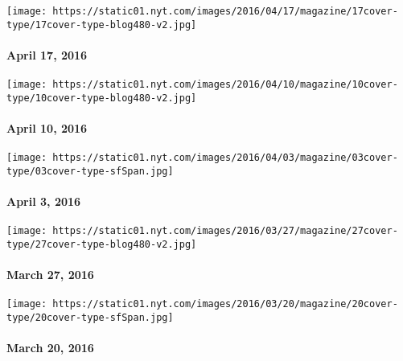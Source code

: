 \href{http://www.nytimes.com/indexes/2016/04/17/magazine/index.html}{}

\texttt{[image: https://static01.nyt.com/images/2016/04/17/magazine/17cover-type/17cover-type-blog480-v2.jpg]}

\hypertarget{april-17-2016}{%
\paragraph{April 17, 2016}\label{april-17-2016}}

\href{http://www.nytimes.com/indexes/2016/04/11/magazine/index.html}{}

\texttt{[image: https://static01.nyt.com/images/2016/04/10/magazine/10cover-type/10cover-type-blog480-v2.jpg]}

\hypertarget{april-10-2016}{%
\paragraph{April 10, 2016}\label{april-10-2016}}

\href{http://www.nytimes.com/indexes/2016/04/03/magazine/index.html}{}

\texttt{[image: https://static01.nyt.com/images/2016/04/03/magazine/03cover-type/03cover-type-sfSpan.jpg]}

\hypertarget{april-3-2016}{%
\paragraph{April 3, 2016}\label{april-3-2016}}

\href{http://www.nytimes.com/indexes/2016/03/27/magazine/index.html}{}

\texttt{[image: https://static01.nyt.com/images/2016/03/27/magazine/27cover-type/27cover-type-blog480-v2.jpg]}

\hypertarget{march-27-2016}{%
\paragraph{March 27, 2016}\label{march-27-2016}}

\href{http://www.nytimes.com/indexes/2016/03/20/magazine/index.html}{}

\texttt{[image: https://static01.nyt.com/images/2016/03/20/magazine/20cover-type/20cover-type-sfSpan.jpg]}

\hypertarget{march-20-2016}{%
\paragraph{March 20, 2016}\label{march-20-2016}}

